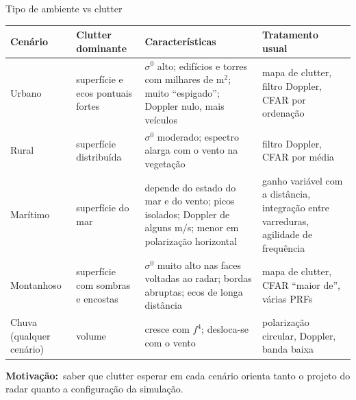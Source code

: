 \documentclass[aspectratio=169, 10pt]{beamer}
\newcommand{\rot}[2]{\textbf{\textcolor{#1}{#2}}}
\newcommand{\motiv}{\rot{accentgold}{Motivação:}\ }
\newcommand{\cab}[1]{\textbf{\textcolor{radarcyan}{#1}}}
\begin{document}
\begin{frame}[t]{Tipo de ambiente vs clutter}
  \footnotesize
  \renewcommand{\arraystretch}{1.2}
  \begin{tabular}{@{}L{1.7cm}L{2.5cm}L{4.5cm}L{3.9cm}@{}}
    \toprule
    \cab{Cenário} & \cab{Clutter dominante} & \cab{Características} & \cab{Tratamento usual} \\
    \midrule
    Urbano & superfície e ecos pontuais fortes & $\sigma^0$ alto; edifícios e torres com milhares de m$^2$; muito ``espigado''; Doppler nulo, mais veículos & mapa de clutter, filtro Doppler, CFAR por ordenação \\
    Rural & superfície distribuída & $\sigma^0$ moderado; espectro alarga com o vento na vegetação & filtro Doppler, CFAR por média \\
    Marítimo & superfície do mar & depende do estado do mar e do vento; picos isolados; Doppler de alguns m/s; menor em polarização horizontal & ganho variável com a distância, integração entre varreduras, agilidade de frequência \\
    Montanhoso & superfície com sombras e encostas & $\sigma^0$ muito alto nas faces voltadas ao radar; bordas abruptas; ecos de longa distância & mapa de clutter, CFAR ``maior de'', várias PRFs \\
    Chuva (qualquer cenário) & volume & cresce com $f^4$; desloca-se com o vento & polarização circular, Doppler, banda baixa \\
    \bottomrule
  \end{tabular}
  \vspace{2pt}

  \motiv saber que clutter esperar em cada cenário orienta tanto o projeto do radar quanto a configuração da simulação.
\end{frame}
\end{document}
